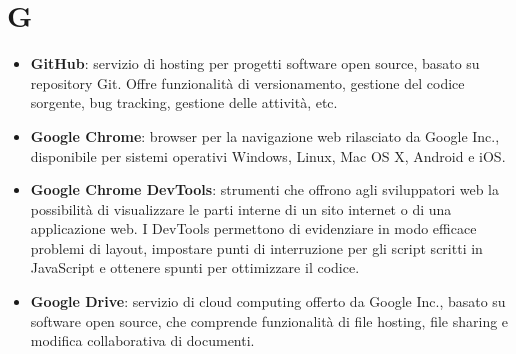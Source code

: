 \section{G}
\begin{itemize}
	\item \textbf{GitHub}: servizio di hosting per progetti software open source, basato su repository Git. Offre funzionalità di versionamento, gestione del codice sorgente, bug tracking, gestione delle attività, etc.
	\item \textbf{Google Chrome}: browser per la navigazione web rilasciato da Google Inc., disponibile per sistemi operativi Windows, Linux, Mac OS X, Android e iOS. 
	\item \textbf{Google Chrome DevTools}: strumenti che offrono agli sviluppatori web la possibilità di visualizzare le parti interne di un sito internet o di una applicazione web. I DevTools permettono di evidenziare in modo efficace problemi di layout, impostare punti di interruzione per gli script scritti in JavaScript e ottenere spunti per ottimizzare il codice.
	\item \textbf{Google Drive}: servizio di cloud computing offerto da Google Inc., basato su software open source, che comprende funzionalità di file hosting, file sharing e modifica collaborativa di documenti.
\end{itemize}
